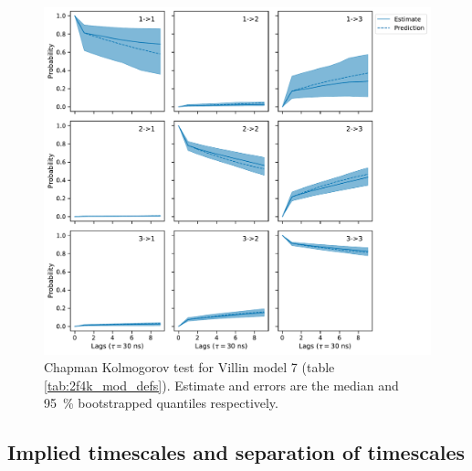 \documentclass{article}
\begin{document}
\begin{figure}
    \centering
    \includegraphics[height=0.4\textheight]{figures/cktests/villin/m2_dist_hpix79_cktest.pdf}
    \caption{Chapman Kolmogorov test for Villin model 7 (table \ref{tab:2f4k_mod_defs}). Estimate and errors are the median and \SI{95}{\percent} bootstrapped quantiles respectively.}
    \label{fig:cktest_villin_7}
\end{figure}

\clearpage
\subsection{Implied timescales and separation of timescales}
\end{document}
